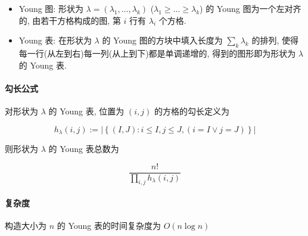 \begin{itemize}
    \item Young 图: 形状为 \(\lambda=(\lambda_1,\dots,\lambda_k)\) (\(\lambda_1\geq \dots\geq \lambda_k\)) 的 Young 图为一个左对齐的, 由若干方格构成的图, 第 \(i\) 行有 \(\lambda_i\) 个方格.
    \item Young 表: 在形状为 \(\lambda\) 的 Young 图的方块中填入长度为 \(\sum_k \lambda_k\) 的排列, 使得每一行(从左到右)每一列(从上到下)都是单调递增的, 得到的图形即为形状为 \(\lambda\) 的 Young 表.
\end{itemize}

\paragraph{勾长公式}

对形状为 \(\lambda\) 的 Young 表, 位置为 \((i,j)\) 的方格的勾长定义为

\[
    h_{\lambda}(i,j):=\left|\left\{(I,J):i\leq I, j\leq J,(i=I \lor j=J)\right\}\right|
\]

则形状为 \(\lambda\) 的 Young 表总数为

\[
    \frac{n!}{\prod_{i,j} h_{\lambda}(i,j)}
\]

\paragraph{复杂度}

构造大小为 \(n\) 的 Young 表的时间复杂度为 \(O(n\log n)\)
